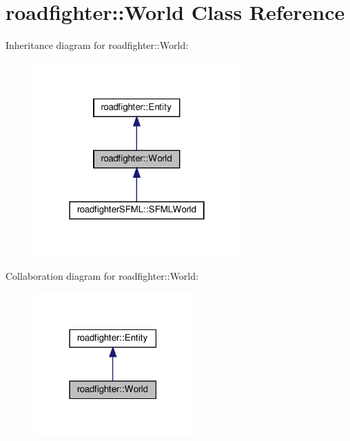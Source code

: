 \hypertarget{classroadfighter_1_1World}{}\section{roadfighter\+:\+:World Class Reference}
\label{classroadfighter_1_1World}


Inheritance diagram for roadfighter\+:\+:World\+:
\nopagebreak
\begin{figure}[H]
\begin{center}
\leavevmode
\includegraphics[width=226pt]{classroadfighter_1_1World__inherit__graph}
\end{center}
\end{figure}


Collaboration diagram for roadfighter\+:\+:World\+:\nopagebreak
\begin{figure}[H]
\begin{center}
\leavevmode
\includegraphics[width=174pt]{classroadfighter_1_1World__coll__graph}
\end{center}
\end{figure}
